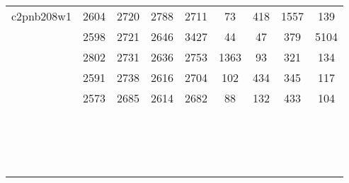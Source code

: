 \documentclass[a4paper, 8pt, envcountsect, runningheads]{article}
\begin{document}
\begin{center}
\begin{longtable}{ |l|c|c|c|c|c|c|c|c| }
	 c2pnb208w1 & 2604 & 2720 & 2788 & 2711 & 73 & 418 & 1557 & 139 \\
	 
	 & 2598 & 2721 & 2646 & 3427 & 44 & 47 & 379 & 5104 \\
	 	 
	 & 2802 & 2731 & 2636 & 2753 & 1363 & 93 & 321 & 134 \\
	 
	 & 2591 & 2738 & 2616 & 2704 & 102 & 434 & 345 & 117 \\
	 
	 & 2573 & 2685 & 2614 & 2682 & 88 & 132 & 433 & 104 \\ \hline
	 
	 &  &  &  &  &  &  &  &  \\
	 
	 &  &  &  &  &  &  &  &  \\
	 	 
	 &  &  &  &  &  &  &  &  \\
	 
	 &  &  &  &  &  &  &  &  \\
	 
	 &  &  &  &  &  &  &  &  \\ \hline
	 
	 	 
	 	 
	 	 
	 	 
	 &  &  &  &  &  &  &  &  \\
	 
	 &  &  &  &  &  &  &  &  \\
	 	 
	 &  &  &  &  &  &  &  &  \\
	 
	 &  &  &  &  &  &  &  &  \\
	 
	 &  &  &  &  &  &  &  &  \\ \hline
	 
	 &  &  &  &  &  &  &  &  \\
	 
	 &  &  &  &  &  &  &  &  \\
	 	 
	 &  &  &  &  &  &  &  &  \\
	 
	 &  &  &  &  &  &  &  &  \\
	 
	 &  &  &  &  &  &  &  &  \\ \hline
	 	 
	 &  &  &  &  &  &  &  &  \\
	 

\end{longtable}
\end{center}
\end{document}
